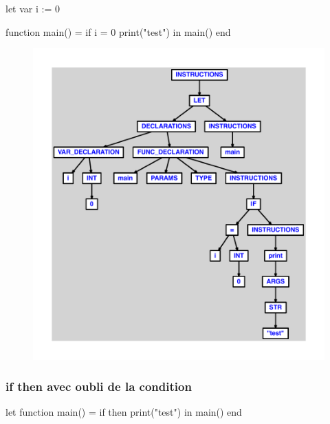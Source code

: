 \documentclass{article}
\begin{document}
\begin{verbatimtab}
let
	var i := 0

	function main() =
		if i = 0
			print("test")
in main() end
\end{verbatimtab}
\begin{figure}[H]\centering\includegraphics[max width=\textwidth]{ast/ast_243.pdf}\end{figure}\subsubsection{if then avec oubli de la condition}
\begin{verbatimtab}
let
	function main() =
		if then
			print("test")
in main() end
\end{verbatimtab}
\end{document}
